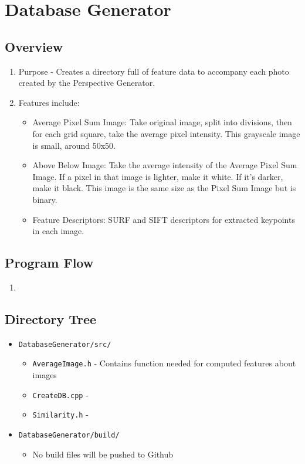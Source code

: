 \documentclass[a4paper,11pt]{article}
\begin{document}
        



\section{Database Generator}
  \subsection{Overview}
    \begin{enumerate}
    \item Purpose - Creates a directory full of feature data to accompany each photo created by the Perspective Generator. 
    \item Features include:
      \begin{itemize}
        \item Average Pixel Sum Image: Take original image, split into divisions, then for each grid square, take the average pixel intensity. This grayscale image is small, around 50x50.
        \item Above Below Image: Take the average intensity of the Average Pixel Sum Image. If a pixel in that image is lighter, make it white. If it's darker, make it black. This image is the same size as the Pixel Sum Image but is binary.
        \item Feature Descriptors: SURF and SIFT descriptors for extracted keypoints in each image.
      \end{itemize}
    \end{enumerate}
  \subsection{Program Flow}
    \begin{enumerate}
     \item 
    \end{enumerate}
  \subsection{Directory Tree}
    \begin{itemize}
     \item \texttt{DatabaseGenerator/src/}
       \begin{itemize}
        \item \texttt{AverageImage.h} - Contains function needed for computed features about images
        \item \texttt{CreateDB.cpp} -
        \item \texttt{Similarity.h} -
       \end{itemize}
     \item \texttt{DatabaseGenerator/build/}
       \begin{itemize}
        \item No build files will be pushed to Github
       \end{itemize}
    \end{itemize}
\end{document}
